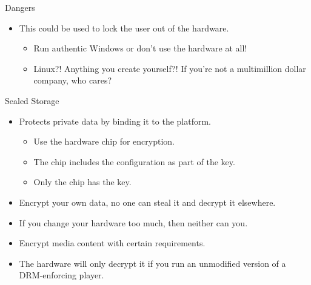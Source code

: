 \begin{frame}
  \begin{alertblock}{Dangers}
    \begin{itemize}
      \item This could be used to lock the user out of the hardware.
        \begin{itemize}
          \item Run authentic Windows or don't use the hardware at all!
          \item Linux?!
            Anything you create yourself?!
            If you're not a multimillion dollar company, who cares?
        \end{itemize}
    \end{itemize}
  \end{alertblock}
\end{frame}

\begin{frame}
  \begin{block}{Sealed Storage}
    \begin{itemize}
      \item Protects private data by binding it to the platform.
        \begin{itemize}
          \item Use the hardware chip for encryption.
          \item The chip includes the configuration as part of the key.
          \item Only the chip has the key.
        \end{itemize}
    \end{itemize}
  \end{block}
\end{frame}

\begin{frame}
  \begin{example}
    \begin{itemize}
      \item Encrypt your own data, no one can steal it and decrypt it 
        elsewhere.
      \item If you change your hardware too much, then neither can you.
    \end{itemize}
  \end{example}

  \pause{}

  \begin{example}
    \begin{itemize}
      \item Encrypt media content with certain requirements.
      \item The hardware will only decrypt it if you run an unmodified version 
        of a DRM-enforcing player.
    \end{itemize}
  \end{example}
\end{frame}

